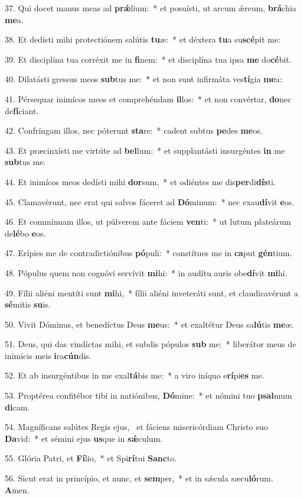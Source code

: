 37. Qui docet manus meas ad \textbf{prǽ}lium:~*  et posuísti, ut arcum ǽreum, \textbf{brá}chia \textbf{me}a.\

38. Et dedísti mihi protectiónem salútis \textbf{tu}æ:~*  et déxtera \textbf{tu}a su\textbf{scé}pit me:\

39. Et disciplína tua corréxit me in \textbf{fi}nem:~*  et disciplína tua ipsa \textbf{me} do\textbf{cé}bit.\

40. Dilatásti gressus meos \textbf{sub}tus me:~*  et non sunt infirmáta ves\textbf{tí}gia \textbf{me}a:\

41. Pérsequar inimícos meos et comprehéndam \textbf{il}los:~*  et non convértar, \textbf{do}nec de\textbf{fí}ciant.\

42. Confríngam illos, nec póterunt \textbf{sta}re:~*  cadent subtus \textbf{pe}des \textbf{me}os.\

43. Et præcinxísti me virtúte ad \textbf{bel}lum:~*  et supplantásti insurgéntes \textbf{in} me \textbf{sub}tus me.\

44. Et inimícos meos dedísti mihi \textbf{dor}sum,~*  et odiéntes me dis\textbf{per}di\textbf{dís}ti.\

45. Clamavérunt, nec erat qui salvos fáceret ad \textbf{Dó}minum:~*  nec exau\textbf{dí}vit \textbf{e}os.\

46. Et commínuam illos, ut púlverem ante fáciem \textbf{ven}ti:~*  ut lutum plateárum de\textbf{lé}bo \textbf{e}os.\

47. Erípies me de contradictiónibus \textbf{pó}puli:~*  constítues me in \textbf{ca}put \textbf{gén}tium.\

48. Pópulus quem non cognóvi servívit \textbf{mi}hi:~*  in audítu auris obe\textbf{dí}vit \textbf{mi}hi.\

49. Fílii aliéni mentíti sunt \textbf{mi}hi,~*  fílii aliéni inveteráti sunt, et claudicavérunt a \textbf{sé}mitis \textbf{su}is.\

50. Vivit Dóminus, et benedíctus Deus \textbf{me}us:~*  et exaltétur Deus sa\textbf{lú}tis \textbf{me}æ.\

51. Deus, qui das vindíctas mihi, et subdis pópulos \textbf{sub} me:~*  liberátor meus de inimícis meis \textbf{i}ra\textbf{cún}dis.\

52. Et ab insurgéntibus in me exal\textbf{tá}bis me:~*  a viro iníquo e\textbf{rí}pi\textbf{es} me.\

53. Proptérea confitébor tibi in natiónibus, \textbf{Dó}mine:~*  et nómini tuo \textbf{psal}mum \textbf{di}cam.\

54. Magníficans salútes Regis ejus, \dag\  et fáciens misericórdiam Christo suo \textbf{Da}vid:~*  et sémini ejus \textbf{us}que in \textbf{sǽ}culum.\

55. Glória Patri, et \textbf{Fí}lio,~*  et Spi\textbf{rí}tui \textbf{Sanc}to.\

56. Sicut erat in princípio, et nunc, et \textbf{sem}per,~*  et in sǽcula sæcu\textbf{ló}rum. \textbf{A}men.\

